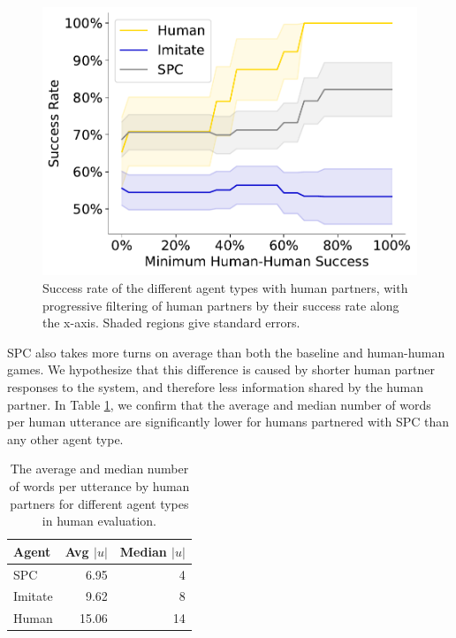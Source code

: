 \documentclass[11pt]{article}
\newcommand{\system}{SPC}
\begin{document}
\begin{figure}[!t]
\includegraphics[width=\columnwidth]{imgs/Figure_1.pdf}
\caption{
\label{fig:segmented_success}
Success rate of the different agent types with human partners, with progressive filtering of human partners by their success rate along the x-axis. Shaded regions give standard errors.
}
\end{figure}


\system{} also takes more turns on average than both the baseline and human-human games.
We hypothesize that this difference is caused by shorter human partner
responses to the system, and therefore less information shared by the human partner.
In Table \ref{tbl:uttlen}, we confirm that the average and median number of words per human utterance are significantly lower for humans partnered with \system{} than any other agent type.


\begin{table}[!t]
\centering
\begin{tabular}{lrr}
\toprule
Agent                    & Avg $|u|$ & Median $|u|$\\
\midrule
\system{}                & 6.95    & 4\\
Imitate                  & 9.62    & 8\\
Human                    & 15.06   & 14\\
\bottomrule
\end{tabular}
\caption{\label{tbl:uttlen}
The average and median number of words per utterance by human partners for different agent types in human evaluation.
\vspace{1em}
}\end{table}
\end{document}
